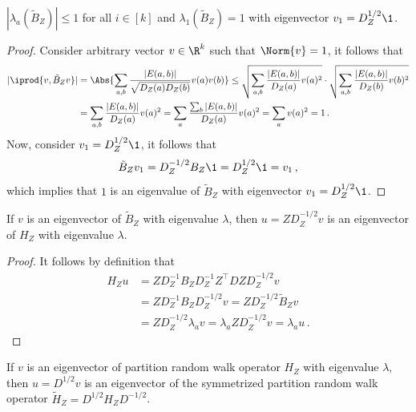 \begin{lemma}
\label{lem:rp_tilde_B_eigenvalues}
    $|\lambda_a (\tilde{B}_Z)| \leq 1$ for all $i \in [k]$ and $\lambda_1(\tilde{B}_Z) = 1$ with eigenvector $v_1 = D_Z^{1/2} \1$.
\end{lemma}

\begin{proof}
    Consider arbitrary vector $v \in \R^k$ such that $\Norm{v} = 1$, it follows that
    \begin{align*}
        |\iprod{v, \tilde{B}_Z v}|
        & = \Abs{\sum_{a, b} \frac{|E(a, b)|}{\sqrt{D_Z(a) D_Z(b)}} v(a) v(b)}
        \leq \sqrt{\sum_{a, b} \frac{|E(a, b)|}{D_Z(a)} v(a)^2} \cdot \sqrt{\sum_{a, b} \frac{|E(a, b)|}{D_Z(b)} v(b)^2} \\
        & = \sum_{a, b} \frac{|E(a, b)|}{D_Z(a)} v(a)^2
        = \sum_{a} \frac{\sum_b |E(a, b)|}{D_Z(a)} v(a)^2
        = \sum_{a} v(a)^2 = 1 \,.
    \end{align*}
    Now, consider $v_1 = D_Z^{1/2} \1$, it follows that
    \begin{equation*}
        \tilde{B}_Z v_1 = D_Z^{-1/2} B_Z \1 =  D_Z^{1/2} \1 = v_1 \,,
    \end{equation*}
    which implies that $1$ is an eigenvalue of $\tilde{B}_Z$ with eigenvector $v_1 = D_Z^{1/2} \1$.
\end{proof}

\begin{lemma}
\label{lem:rp_eigen_equivalence_B_H}
    If $v$ is an eigenvector of $\tilde{B}_Z$ with eigenvalue $\lambda$, then $u = Z D_Z^{-1/2} v$ is an eigenvector of $H_Z$ with eigenvalue $\lambda$.
\end{lemma}

\begin{proof}
    It follows by definition that
    \begin{align*}
        H_Z u
        & = Z D_Z^{-1} B_Z D_Z^{-1} Z^{\top} D Z D_Z^{-1/2} v \\
        & = Z D_Z^{-1} B_Z D_Z^{-1/2} v
        = Z D_Z^{-1/2} \tilde{B}_Z v \\
        & = Z D_Z^{-1/2} \lambda_a v
        = \lambda_a Z D_Z^{-1/2} v
        = \lambda_a u \,.
    \end{align*}
\end{proof}

\begin{lemma}
\label{lem:rp_eigen_equivalence_H_tilde_H}
    If $v$ is an eigenvector of partition random walk operator $H_Z$ with eigenvalue $\lambda$, then $u=D^{1/2} v$ is an eigenvector of the symmetrized partition random walk operator $\tilde{H}_Z = D^{1/2} H_Z D^{- 1/2}$.
\end{lemma}

